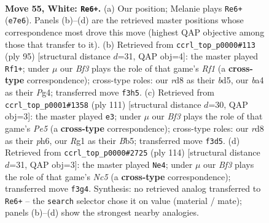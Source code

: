 \documentclass[11pt]{article}
\begin{document}
\clearpage

\begin{figure}[p]\centering
\begin{subfigure}{0.46\textwidth}\centering
\resizebox{\linewidth}{!}{%
\newchessgame
\chessboard[
  setfen={1r1r4/4R3/pp5k/8/bP6/P4B1K/8/6R1 w - - 12 55},
  showmover=false,
  pgfstyle=straightmove, color=movearrow, markmove={e7-e6}
]}
\caption{}
\end{subfigure}\hfill
\begin{subfigure}{0.46\textwidth}\centering
\resizebox{\linewidth}{!}{%
\newchessgame
\chessboard[
  setfen={5r2/8/7k/1p1BR3/1P1p2p1/3P2Pb/8/6K1 b - - 0 48},
  showmover=false,
  pgfstyle=straightmove, color=movearrow, markmove={f8-f1}
]}
\caption{}
\end{subfigure}
\\[4pt]
\begin{subfigure}{0.46\textwidth}\centering
\resizebox{\linewidth}{!}{%
\newchessgame
\chessboard[
  setfen={5k2/7R/1B4pP/1b2p1P1/4p3/8/2r5/4K3 b - - 0 56},
  showmover=false,
  pgfstyle=straightmove, color=movearrow, markmove={e4-e3}
]}
\caption{}
\end{subfigure}\hfill
\begin{subfigure}{0.46\textwidth}\centering
\resizebox{\linewidth}{!}{%
\newchessgame
\chessboard[
  setfen={R7/4rk1p/6p1/2N1b1P1/7P/5K2/8/8 w - - 13 58},
  showmover=false,
  pgfstyle=straightmove, color=movearrow, markmove={c5-e4}
]}
\caption{}
\end{subfigure}
\caption{\textbf{Move 55, White: \texttt{Re6+}.} (a) Our position; Melanie plays \texttt{Re6+} (\texttt{e7e6}). Panels (b)--(d) are the retrieved master positions whose correspondence most drove this move (highest QAP objective among those that transfer to it). (b) Retrieved from \texttt{ccrl\_top\_p0000\#113} (ply 95) [structural distance $d$=31, QAP obj=4]: the master played \texttt{Rf1+}; under $\mu$ our \emph{Bf3} plays the role of that game's \emph{Rf1} (a \textbf{cross-type} correspondence); cross-type roles: our \emph{r}d8 as their \emph{b}d5, our \emph{b}a4 as their \emph{P}g4; transferred move \texttt{f3h5}. (c) Retrieved from \texttt{ccrl\_top\_p0001\#1358} (ply 111) [structural distance $d$=30, QAP obj=3]: the master played \texttt{e3}; under $\mu$ our \emph{Bf3} plays the role of that game's \emph{Pe5} (a \textbf{cross-type} correspondence); cross-type roles: our \emph{r}d8 as their \emph{p}h6, our \emph{R}g1 as their \emph{B}b5; transferred move \texttt{f3d5}. (d) Retrieved from \texttt{ccrl\_top\_p0000\#2725} (ply 114) [structural distance $d$=31, QAP obj=3]: the master played \texttt{Ne4}; under $\mu$ our \emph{Bf3} plays the role of that game's \emph{Nc5} (a \textbf{cross-type} correspondence); transferred move \texttt{f3g4}. Synthesis: no retrieved analog transferred to \texttt{Re6+} -- the \texttt{search} selector chose it on value (material / mate); panels (b)--(d) show the strongest nearby analogies.}
\label{fig:thought-m108}
\end{figure}
\end{document}
